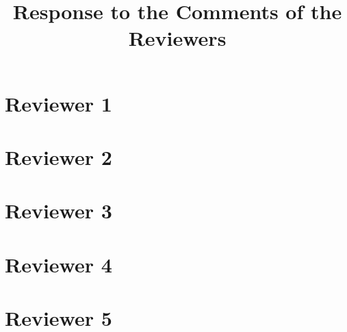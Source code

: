 \documentclass{article}
\begin{document}

  \title{Response to the Comments of the Reviewers}

  \author{}
  \date{}

  \maketitle

  \section*{Reviewer 1}
  

  \section*{Reviewer 2}
  

  \section*{Reviewer 3}
  

  \section*{Reviewer 4}
  

  \section*{Reviewer 5}
  
\end{document}
